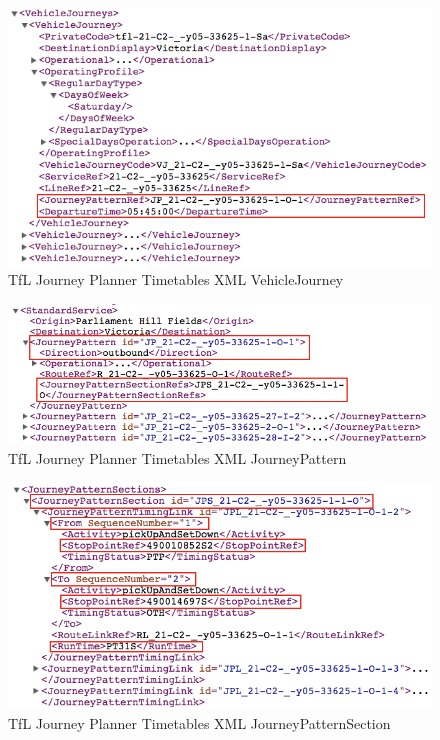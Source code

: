 \begin{figure}
\centering
\includegraphics[width=\textwidth]{figures/xml_vehicle_journeys.png}
\caption{\label{fig:xml_vehicle_journeys} TfL Journey Planner Timetables XML VehicleJourney}
\end{figure}


\begin{figure}
\centering
\includegraphics[width=\textwidth]{figures/xml_journeypattern.png}
\caption{\label{fig:xml_journeypattern} TfL Journey Planner Timetables XML JourneyPattern}
\end{figure}

\begin{figure}
\centering
\includegraphics[width=\textwidth]{figures/xml_journey_pattern_section.png}
\caption{\label{fig:xml_journey_pattern_section} TfL Journey Planner Timetables XML JourneyPatternSection}
\end{figure}

